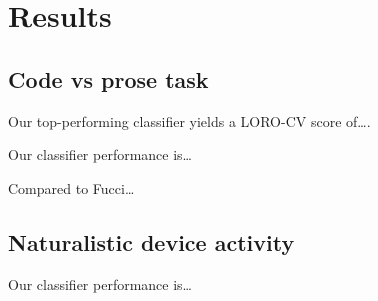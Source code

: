\section{Results}

    \subsection{Code vs prose task}

        Our top-performing classifier yields a LORO-CV score of\ldots.

        Our classifier performance is\ldots

        Compared to Fucci\ldots

    \subsection{Naturalistic device activity}

        Our classifier performance is\ldots

